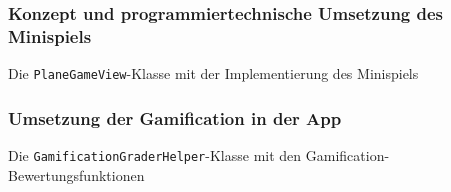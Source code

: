 \tocless\subsubsection{Konzept und programmiertechnische Umsetzung des Minispiels}
\begin{longlisting}
	\caption{Die \texttt{PlaneGameView}-Klasse mit der Implementierung des Minispiels}
	\label{listing:game}
\end{longlisting}

\tocless\subsubsection{Umsetzung der Gamification in der App}
\begin{longlisting}
	\caption{Die \texttt{GamificationGraderHelper}-Klasse mit den Gamification-Bewertungsfunktionen}
	\label{listing:gamification}
\end{longlisting}